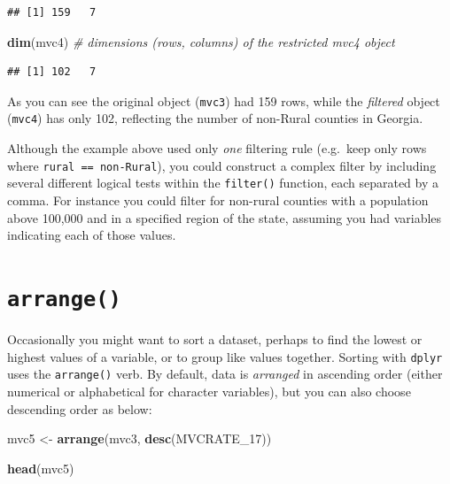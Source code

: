 \documentclass[
]{book}
\newenvironment{Shaded}{\begin{snugshade}}{\end{snugshade}}
\newcommand{\CommentTok}[1]{\textcolor[rgb]{0.56,0.35,0.01}{\textit{#1}}}
\newcommand{\FunctionTok}[1]{\textcolor[rgb]{0.13,0.29,0.53}{\textbf{#1}}}
\newcommand{\NormalTok}[1]{#1}
\newcommand{\OtherTok}[1]{\textcolor[rgb]{0.56,0.35,0.01}{#1}}
\newenvironment{rmdnote}[1]
  {
  \begin{itemize}
  \renewcommand{\labelitemi}{
    \raisebox{-.7\height}[0pt][0pt]{
      {\setkeys{Gin}{width=3em,keepaspectratio}\texttt{[image: images/\#1]}}
    }
  }
  \setlength{\fboxsep}{1em}
  \begin{note}
  \item
  }
  {
  \end{note}
  \end{itemize}
  }
\begin{document}
\begin{verbatim}
## [1] 159   7
\end{verbatim}

\begin{Shaded}
\begin{Highlighting}[]
\FunctionTok{dim}\NormalTok{(mvc4) }\CommentTok{\# dimensions (rows, columns) of the restricted mvc4 object}
\end{Highlighting}
\end{Shaded}

\begin{verbatim}
## [1] 102   7
\end{verbatim}

As you can see the original object (\texttt{mvc3}) had 159 rows, while the \emph{filtered} object (\texttt{mvc4}) has only 102, reflecting the number of non-Rural counties in Georgia.

\begin{rmdnote}{note}
Although the example above used only \emph{one} filtering rule (e.g.~keep only rows where \texttt{rural\ ==\ \textquotesingle{}non-Rural\textquotesingle{}}), you could construct a complex filter by including several different logical tests within the \texttt{filter()} function, each separated by a comma. For instance you could filter for non-rural counties with a population above 100,000 and in a specified region of the state, assuming you had variables indicating each of those values.

\end{rmdnote}

\hypertarget{arrange}{%
\section{\texorpdfstring{\texttt{arrange()}}{arrange()}}\label{arrange}}

Occasionally you might want to sort a dataset, perhaps to find the lowest or highest values of a variable, or to group like values together. Sorting with \texttt{dplyr} uses the \texttt{arrange()} verb. By default, data is \emph{arranged} in ascending order (either numerical or alphabetical for character variables), but you can also choose descending order as below:

\begin{Shaded}
\begin{Highlighting}[]
\NormalTok{mvc5 }\OtherTok{\textless{}{-}} \FunctionTok{arrange}\NormalTok{(mvc3, }\FunctionTok{desc}\NormalTok{(MVCRATE\_17))}

\FunctionTok{head}\NormalTok{(mvc5)}
\end{Highlighting}
\end{Shaded}
\end{document}
